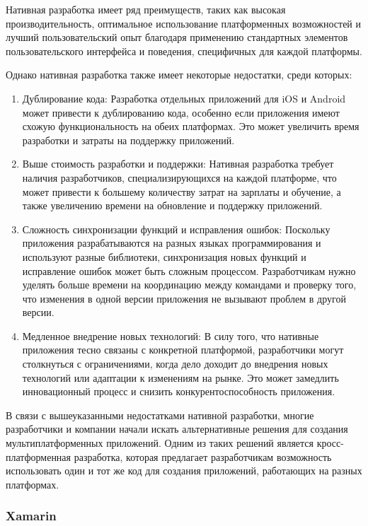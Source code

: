 \documentclass[14pt, russian]{scrartcl}
\begin{document}
Нативная разработка имеет ряд преимуществ, таких как высокая производительность, оптимальное использование платформенных возможностей и лучший пользовательский опыт благодаря применению стандартных элементов пользовательского интерфейса и поведения, специфичных для каждой платформы.

Однако нативная разработка также имеет некоторые недостатки, среди которых:

\begin{enumerate}
    \item Дублирование кода: Разработка отдельных приложений для iOS и Android может привести к дублированию кода, особенно если приложения имеют схожую функциональность на обеих платформах. Это может увеличить время разработки и затраты на поддержку приложений.
    \item Выше стоимость разработки и поддержки: Нативная разработка требует наличия разработчиков, специализирующихся на каждой платформе, что может привести к большему количеству затрат на зарплаты и обучение, а также увеличению времени на обновление и поддержку приложений.
    \item Сложность синхронизации функций и исправления ошибок: Поскольку приложения разрабатываются на разных языках программирования и используют разные библиотеки, синхронизация новых функций и исправление ошибок может быть сложным процессом. Разработчикам нужно уделять больше времени на координацию между командами и проверку того, что изменения в одной версии приложения не вызывают проблем в другой версии.
    \item Медленное внедрение новых технологий: В силу того, что нативные приложения тесно связаны с конкретной платформой, разработчики могут столкнуться с ограничениями, когда дело доходит до внедрения новых технологий или адаптации к изменениям на рынке. Это может замедлить инновационный процесс и снизить конкурентоспособность приложения.
\end{enumerate}

В связи с вышеуказанными недостатками нативной разработки, многие разработчики и компании начали искать альтернативные решения для создания мультиплатформенных приложений. Одним из таких решений является кросс-платформенная разработка, которая предлагает разработчикам возможность использовать один и тот же код для создания приложений, работающих на разных платформах.

\subsubsection{Xamarin}
\end{document}
